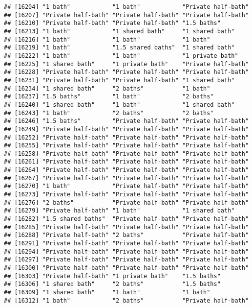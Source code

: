 \documentclass[
]{article}
\begin{document}
\begin{verbatim}
## [16204] "1 bath"            "1 bath"            "Private half-bath"
## [16207] "Private half-bath" "Private half-bath" "Private half-bath"
## [16210] "Private half-bath" "Private half-bath" "1.5 baths"        
## [16213] "1 bath"            "1 shared bath"     "1 shared bath"    
## [16216] "1 bath"            "1 bath"            "1 bath"           
## [16219] "1 bath"            "1.5 shared baths"  "1 shared bath"    
## [16222] "1 bath"            "1 bath"            "1 private bath"   
## [16225] "1 shared bath"     "1 private bath"    "Private half-bath"
## [16228] "Private half-bath" "Private half-bath" "Private half-bath"
## [16231] "Private half-bath" "Private half-bath" "1 shared bath"    
## [16234] "1 shared bath"     "2 baths"           "1 bath"           
## [16237] "1.5 baths"         "1 bath"            "2 baths"          
## [16240] "1 shared bath"     "1 bath"            "1 shared bath"    
## [16243] "1 bath"            "2 baths"           "2 baths"          
## [16246] "1.5 baths"         "Private half-bath" "Private half-bath"
## [16249] "Private half-bath" "Private half-bath" "Private half-bath"
## [16252] "Private half-bath" "Private half-bath" "Private half-bath"
## [16255] "Private half-bath" "Private half-bath" "Private half-bath"
## [16258] "Private half-bath" "Private half-bath" "Private half-bath"
## [16261] "Private half-bath" "Private half-bath" "Private half-bath"
## [16264] "Private half-bath" "Private half-bath" "Private half-bath"
## [16267] "Private half-bath" "Private half-bath" "Private half-bath"
## [16270] "1 bath"            "Private half-bath" "Private half-bath"
## [16273] "Private half-bath" "Private half-bath" "Private half-bath"
## [16276] "2 baths"           "Private half-bath" "Private half-bath"
## [16279] "Private half-bath" "1 bath"            "1 shared bath"    
## [16282] "1.5 shared baths"  "Private half-bath" "Private half-bath"
## [16285] "Private half-bath" "Private half-bath" "Private half-bath"
## [16288] "Private half-bath" "2 baths"           "Private half-bath"
## [16291] "Private half-bath" "Private half-bath" "Private half-bath"
## [16294] "Private half-bath" "Private half-bath" "Private half-bath"
## [16297] "Private half-bath" "Private half-bath" "Private half-bath"
## [16300] "Private half-bath" "Private half-bath" "Private half-bath"
## [16303] "Private half-bath" "1 private bath"    "1.5 baths"        
## [16306] "1 shared bath"     "2 baths"           "1.5 baths"        
## [16309] "1 shared bath"     "1 bath"            "1 bath"           
## [16312] "1 bath"            "2 baths"           "Private half-bath"

\end{verbatim}
\end{document}
